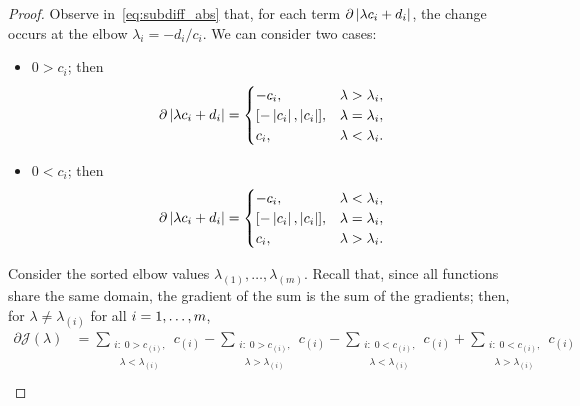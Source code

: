 \begin{proof}
    Observe in~\eqref{eq:subdiff_abs} that, for each term $\partial \left|\lambda c_i + d_i\right|$, the change occurs at the elbow $\lambda_{i} = - d_ i / c_i$. We can consider two cases:
    \begin{itemize}
        \item $0 > c_i$; then
        \begin{equation}
            \nonumber
            \begin{aligned}
                \partial \abs{\lambda c_i + d_i} = 
            \begin{cases}
                -{c_i} ,& \lambda > \lambda_i, \\
                [-\abs{c_i}, \abs{c_i}] ,& \lambda = \lambda_i, \\
                {c_i} ,& \lambda < \lambda_i .\\
            \end{cases}
            \end{aligned}
        \end{equation}
        \item $0 < c_i$; then
        \begin{equation}
            \nonumber
            \begin{aligned}
                \partial \abs{\lambda c_i + d_i} = 
            \begin{cases}
                -{c_i} ,& \lambda < \lambda_i, \\
                [-\abs{c_i}, \abs{c_i}] ,& \lambda = \lambda_i, \\
                {c_i} ,& \lambda > \lambda_i .\\
            \end{cases}
            \end{aligned}
        \end{equation}
    \end{itemize}
    Consider the sorted elbow values $\lambda_{(1)}, \ldots, \lambda_{(m)}$.
    Recall that, since all functions share the same domain, the gradient of the sum is the sum of the gradients; then, for $\lambda \neq \lambda_{(i)}$ for all $i=1,\ldots,m$,
    \begin{equation}\nonumber
        \begin{aligned}
            \partial \mathcal{J}(\lambda) &=  \sum_{\substack{i:\; 0 > c_{(i)},\\ \;\; \lambda < \lambda_{(i)}}} {c_{(i)}} - \sum_{\substack{i:\; 0 > c_{(i)},\\ \;\; \lambda > \lambda_{(i)}}} {c_{(i)}}  - \sum_{\substack{i:\; 0 < c_{(i)},\\ \;\; \lambda < \lambda_{(i)}}} {c_{(i)}} + \sum_{\substack{i:\; 0 < c_{(i)},\\ \;\; \lambda > \lambda_{(i)}}} {c_{(i)}}   \\

\end{aligned}
\end{equation}
\end{proof}
